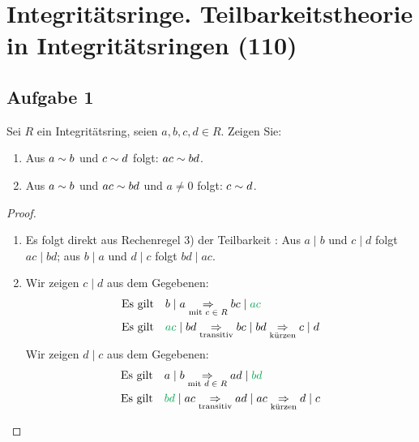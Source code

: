 \section{Integritätsringe. Teilbarkeitstheorie in Integritäts\-ringen (110)}

\subsection{Aufgabe 1}
Sei $R$ ein Integritätsring, seien $a,b,c,d \in R$. Zeigen Sie:
\begin{enumerate}[label=\alph*)]
  \item Aus $a \sim b$ und $c \sim d$ folgt:
        \enspace $ac \sim bd$.
  \item Aus $a \sim b$ und $ac \sim bd$ und
        $a \neq 0$ folgt: \enspace $c \sim d$.
\end{enumerate}

\begin{proof}
  \begin{enumerate}[label=\alph*)]
    \item Es folgt direkt aus Rechenregel 3)
          der Teilbarkeit \parencite[23]{book:zahlentheorie}:
          Aus $a \mid b$ und $c \mid d$ folgt $ac \mid bd$;
          aus $b \mid a$ und $d \mid c$ folgt $bd \mid ac$.
    \item Wir zeigen $c \mid d$ aus dem Gegebenen:
          \begin{align*}
             & \text{Es gilt} \quad b \mid a
            \underset{\text{mit $c \in R$}}{\Rightarrow} bc \mid \textcolor{Green}{ac} \\
             & \text{Es gilt} \quad \textcolor{Green}{ac} \mid bd
            \underset{\text{transitiv}}{\Rightarrow} bc \mid bd
            \underset{\text{kürzen}}{\Rightarrow} c \mid d
          \end{align*}
          Wir zeigen $d \mid c$ aus dem Gegebenen:
          \begin{align*}
             & \text{Es gilt} \quad a \mid b
            \underset{\text{mit $d \in R$}}{\Rightarrow} ad \mid \textcolor{Green}{bd} \\
             & \text{Es gilt} \quad \textcolor{Green}{bd} \mid ac
            \underset{\text{transitiv}}{\Rightarrow} ad \mid ac
            \underset{\text{kürzen}}{\Rightarrow} d \mid c
          \end{align*}
  \end{enumerate}
\end{proof}
